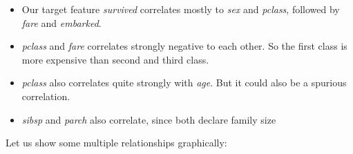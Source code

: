 \documentclass[12,]{article}
\providecommand{\tightlist}{%
  \setlength{\itemsep}{0pt}\setlength{\parskip}{0pt}}
\begin{document}
\begin{itemize}
\tightlist
\item
  Our target feature \emph{survived} correlates mostly to \emph{sex} and
  \emph{pclass}, followed by \emph{fare} and \emph{embarked}.
\item
  \emph{pclass} and \emph{fare} correlates strongly negative to each
  other. So the first class is more expensive than second and third
  class.
\item
  \emph{pclass} also correlates quite strongly with \emph{age}. But it
  could also be a spurious correlation.
\item
  \emph{sibsp} and \emph{parch} also correlate, since both declare
  family size
\end{itemize}

Let us show some multiple relationships graphically:
\end{document}
